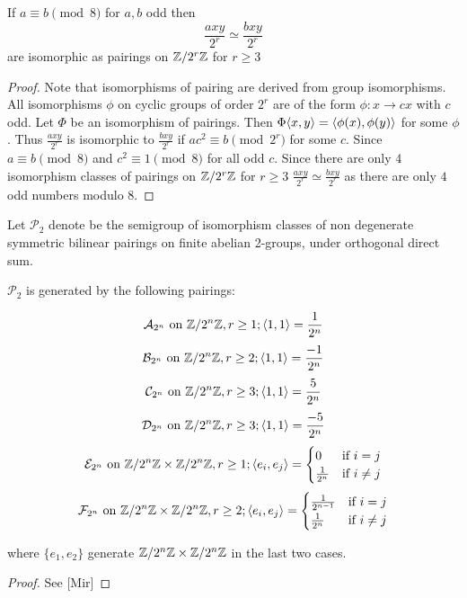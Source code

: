\documentclass{amsart}
\begin{document}
\begin{lem}
 \label{lemma:2-group iso}
 If $a\equiv b\pmod 8$ for $a,b$ odd then
 \begin{equation}
  \frac{axy}{2^{r}}\simeq  \frac{bxy}{2^{r}}
 \end{equation}
  are isomorphic as pairings on $\mathbb{Z}/2^r\mathbb{Z}$ for $r\ge3$
\end{lem}
\begin{proof}
  Note that isomorphisms of pairing are derived from group
  isomorphisms. All isomorphisms $\phi$ on cyclic groups of order
  $2^{r}$ are of the form $\phi:x\to cx$ with $c$ odd. Let $\Phi$ be
  an isomorphism of pairings. Then
  $\Phi\langle x, y \rangle=\langle \phi(x), \phi(y) \rangle$ for some $\phi$. Thus
  $\frac{axy}{2^{r}}$ is isomorphic to $\frac{bxy}{2^{r}}$ if
  $ac^{2}\equiv b\pmod 2^{r}$ for some $c$. Since $a\equiv b\pmod 8$
  and $c^{2}\equiv 1\pmod 8$ for all odd $c$. Since there are only $4$
  isomorphism classes of pairings on $\mathbb{Z}/2^r\mathbb{Z}$ for $r\ge3$ %
  $\frac{axy}{2^{r}}\simeq \frac{bxy}{2^{r}}$ as there are only $4$
  odd numbers modulo $8$.
\end{proof}

\begin{defn}
 Let $\mathcal{P}_{2}$ denote be the semigroup of
isomorphism classes of non degenerate symmetric bilinear pairings on
finite abelian 2-groups, under orthogonal direct sum.

\end{defn}

 \begin{prop} $\mathcal{P}_{2}$ is generated by the following
pairings:
  
   \[ \mathcal{A}_{2^{n}} \text{ on } \mathbb{Z}/2^{n}\mathbb{Z}, r\ge 1; \langle 1,
1\rangle=\frac{1}{2^{n}}
   \]
   \[ \mathcal{B}_{2^{n}} \text{ on } \mathbb{Z}/2^{n}\mathbb{Z}, r\ge 2; \langle 1,
1\rangle=\frac{-1}{2^{n}}
   \]
   \[ \mathcal{C}_{2^{n}} \text{ on } \mathbb{Z}/2^{n}\mathbb{Z}, r\ge 3; \langle 1,
1\rangle=\frac{5}{2^{n}}
   \]
   \[ \mathcal{D}_{2^{n}} \text{ on } \mathbb{Z}/2^{n}\mathbb{Z}, r\ge 3; \langle 1,
1\rangle=\frac{-5}{2^{n}}
   \]
   \[ \mathcal{E}_{2^{n}} \text{ on } \mathbb{Z}/2^{n}\mathbb{Z}\times\mathbb{Z}/2^{n}\mathbb{Z}, r\ge 1; \langle
e_{i}, e_{j}\rangle=\begin{cases}0&\mbox{if } i=j\\
\frac{1}{2^{n}}&\mbox{if } i\neq j\end{cases}
   \]
   \[ \mathcal{F}_{2^{n}} \text{ on } \mathbb{Z}/2^{n}\mathbb{Z}\times\mathbb{Z}/2^{n}\mathbb{Z}, r\ge 2; \langle
e_{i}, e_{j}\rangle=\begin{cases}\frac{1}{2^{n-1}}&\mbox{if } i=j\\
\frac{1}{2^{n}}&\mbox{if } i\neq j\end{cases}
   \]
   
where $\{e_{1}, e_{2}\}$ generate $\mathbb{Z}/2^{n}\mathbb{Z}\times\mathbb{Z}/2^{n}\mathbb{Z}$ in the
last two cases.
 \end{prop}
 \begin{proof} See [Mir]
 \end{proof}
\end{document}
